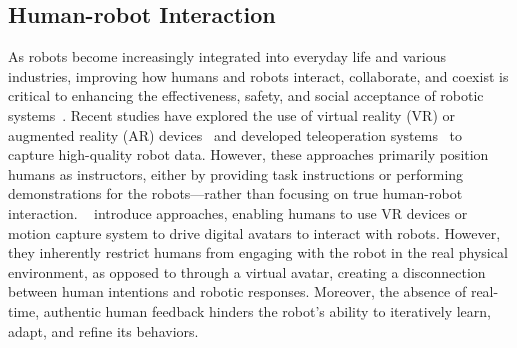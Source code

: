 
\subsection{Human-robot Interaction}
As robots become increasingly integrated into everyday life and various industries, improving how humans and robots interact, collaborate, and coexist is critical to enhancing the effectiveness, safety, and social acceptance of robotic systems~\cite{cakmak2011human}. Recent studies have explored the use of virtual reality (VR) or augmented reality (AR) devices~\cite{chen2024arcap, yang2024arcade, park2024dexhub, nechyporenko2024armada} and developed teleoperation systems~\cite{wonsick2021human,mosbach2022accelerating, iyer2024open, cheng2024open} to capture high-quality robot data. However, these approaches primarily position humans as instructors, either by providing task instructions or performing demonstrations for the robots—rather than focusing on true human-robot interaction. ~\cite{HumanTHOR,liu2024collabsphere} introduce approaches, enabling humans to use VR devices or motion capture system to drive digital avatars to interact with robots.
However, they inherently restrict humans from engaging with the robot in the real physical environment, as opposed to through a virtual avatar, creating a disconnection between human intentions and robotic responses. Moreover, the absence of real-time, authentic human feedback hinders the robot’s ability to iteratively learn, adapt, and refine its behaviors.

